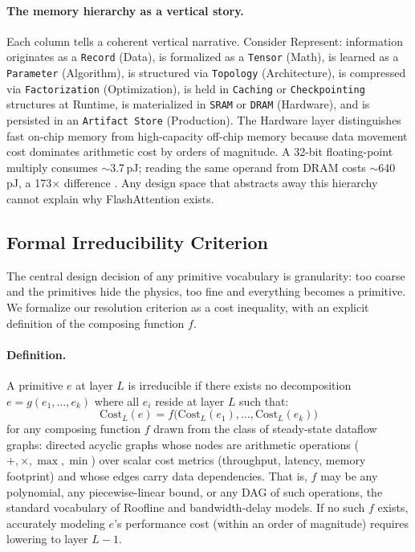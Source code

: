 \documentclass[10pt,twocolumn]{article}
\begin{document}
\paragraph{The memory hierarchy as a vertical story.} Each column tells a coherent vertical narrative. Consider Represent: information originates as a \texttt{Record} (Data), is formalized as a \texttt{Tensor} (Math), is learned as a \texttt{Parameter} (Algorithm), is structured via \texttt{Topology} (Architecture), is compressed via \texttt{Factorization} (Optimization), is held in \texttt{Caching} or \texttt{Checkpointing} structures at Runtime, is materialized in \texttt{SRAM} or \texttt{DRAM} (Hardware), and is persisted in an \texttt{Artifact Store} (Production). The Hardware layer distinguishes fast on-chip memory from high-capacity off-chip memory because data movement cost dominates arithmetic cost by orders of magnitude. A 32-bit floating-point multiply consumes ${\sim}$3.7\,pJ; reading the same operand from DRAM costs ${\sim}$640\,pJ, a 173$\times$ difference \citep{horowitz2014}. Any design space that abstracts away this hierarchy cannot explain why FlashAttention exists.

\subsection{Formal Irreducibility Criterion}
\label{sec:irreducibility}

The central design decision of any primitive vocabulary is granularity: too coarse and the primitives hide the physics, too fine and everything becomes a primitive. We formalize our resolution criterion as a cost inequality, with an explicit definition of the composing function $f$.

\paragraph{Definition.} A primitive $e$ at layer $L$ is irreducible if there exists no decomposition $e = g(e_1, \ldots, e_k)$ where all $e_i$ reside at layer $L$ such that:
\begin{equation}
\label{eq:irreducibility}
\text{Cost}_L(e) = f\bigl(\text{Cost}_L(e_1), \ldots, \text{Cost}_L(e_k)\bigr)
\end{equation}
for any composing function $f$ drawn from the class of steady-state dataflow graphs: directed acyclic graphs whose nodes are arithmetic operations ($+, \times, \max, \min$) over scalar cost metrics (throughput, latency, memory footprint) and whose edges carry data dependencies. That is, $f$ may be any polynomial, any piecewise-linear bound, or any DAG of such operations, the standard vocabulary of Roofline and bandwidth-delay models. If no such $f$ exists, accurately modeling $e$'s performance cost (within an order of magnitude) requires lowering to layer $L{-}1$.
\end{document}
